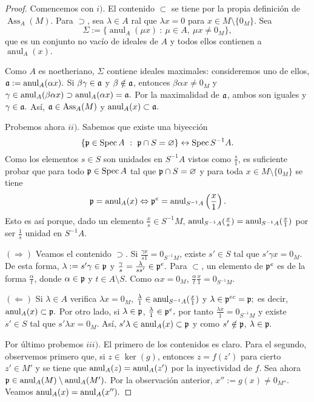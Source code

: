 \documentclass[../main.tex]{subfiles}
\begin{document}
\begin{proof}
Comencemos con $i)$. El contenido $\subset$ se tiene por la propia definición de $\operatorname{Ass}_A(M)$. Para $\supset$, sea $\lambda\in A$ ral que $\lambda x=0$ para $x\in M\setminus\{0_M\}.$ Sea
$$\Sigma:=\{\operatorname{anul}_A(\mu x)\ :\ \mu\in A,\ \mu x\neq 0_M\},$$
que es un conjunto no vacío de ideales de $A$ y todos ellos contienen a $\operatorname{anul}_A(x).$

Como $A$ es noetheriano, $\Sigma$ contiene ideales maximales: consideremos uno de ellos, $\mathfrak{a}:=\operatorname{anul}_A(\alpha x).$ Si $\beta\gamma\in\mathfrak{a}$ y $\beta\notin\mathfrak{a}$, entonces $\beta\alpha x\neq 0_M$ y $\gamma\in\operatorname{anul}_A(\beta\alpha x)\supset\operatorname{anul}_A(\alpha x)=\mathfrak{a}.$ Por la maximalidad de $\mathfrak{a}$, ambos son iguales y $\gamma\in\mathfrak{a}.$ Así, $\mathfrak{a}\in\text{Ass}_A(M)$ y $\operatorname{anul}_A(x)\subset\mathfrak{a}.$

Probemos ahora $ii).$ Sabemos que existe una biyección
$$\{\mathfrak{p}\in\operatorname{Spec} A\ :\ \mathfrak{p}\cap S=\varnothing\}\leftrightarrow\operatorname{Spec}{S^{-1}A}.$$
Como los elementos $s\in S$ son unidades en $S^{-1}A$ vistos como $\frac{s}{1}$, es suficiente probar que para todo $\mathfrak{p}\in\operatorname{Spec} A$ tal que $\mathfrak{p}\cap S=\varnothing$ y para toda $x\in M\setminus\{0_M\}$ se tiene
$$\mathfrak{p}=\operatorname{anul}_A(x)\Leftrightarrow \mathfrak{p}^e=\operatorname{anul}_{S^{-1}A}\left(\frac{x}{1}\right).$$ Esto es así porque, dado un elemento $\frac{x}{s}\in S^{-1}M$, $\operatorname{anul}_{S^{-1}A}(\frac{x}{s})=\operatorname{anul}_{S^{-1}A}(\frac{x}{1})$ por ser $\frac{1}{s}$ unidad en $S^{-1}A.$

$(\Rightarrow)$ Veamos el contenido $\supset$. Si $\frac{\gamma x}{s 1}=0_{S^{-1}M}$, existe $s'\in S$ tal que $s'\gamma x=0_M$. De esta forma, $\lambda:=s'\gamma\in\mathfrak{p}$ y $\frac{\gamma}{s}=\frac{\lambda}{ss'}\in\mathfrak{p}^e.$ Para $\subset$, un elemento de $\mathfrak{p}^e$ es de la forma $\frac{\alpha}{t}$, donde $\alpha\in\mathfrak{p}$ y $t\in A\setminus S.$ Como $\alpha x=0_M$, $\frac{\alpha}{t}\frac{x}{1}=0_{S^{-1}M}.$

$(\Leftarrow)$ Si $\lambda\in A$ verifica $\lambda x=0_M$, $\frac{\lambda}{1}\in\operatorname{anul}_{S^{-1}A}(\frac{x}{1})$ y $\lambda\in\mathfrak{p}^{ec}=\mathfrak{p};$ es decir, $\operatorname{anul}_A(x)\subset\mathfrak{p}.$ Por otro lado, si $\lambda\in\mathfrak{p}$, $\frac{\lambda}{1}\in\mathfrak{p}^e,$ por tanto $\frac{\lambda x}{1}=0_{S^{-1}M}$ y existe $s'\in S$ tal que $s'\lambda x=0_M.$ Así, $s'\lambda\in\operatorname{anul}_A(x)\subset\mathfrak{p}$ y como $s'\notin\mathfrak{p}$, $\lambda\in\mathfrak{p}.$

Por último probemos $iii).$ El primero de los contenidos es claro. Para el segundo, observemos primero que, si $z\in\ker(g)$, entonces $z=f(z')$ para cierto $z'\in M'$ y se tiene que $\operatorname{anul}_A(z)=\operatorname{anul}_A(z')$ por la inyectividad de $f.$ Sea ahora $\mathfrak{p}\in\operatorname{anul}_A(M)\setminus\operatorname{anul}_A(M').$ Por la observación anterior, $x'':=g(x)\neq 0_{M''}.$ Veamos $\operatorname{anul}_A(x)=\operatorname{anul}_A(x'').$


\end{proof}
\end{document}
